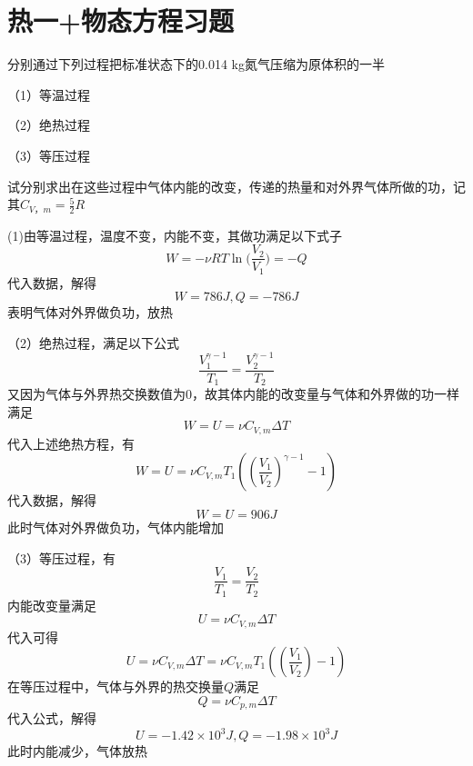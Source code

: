 \documentclass[lang=cn,10pt]{elegantbook}
\begin{document}
	\section{热一+物态方程习题}
	\begin{example}
		分别通过下列过程把标准状态下的0.014 kg氮气压缩为原体积的一半
		
		（1）等温过程
		
		（2）绝热过程
		
		（3）等压过程
		
		试分别求出在这些过程中气体内能的改变，传递的热量和对外界气体所做的功，记其$C_{V，m}=\frac{5}{2}R$
	\end{example}
	\begin{solution}
		(1)由等温过程，温度不变，内能不变，其做功满足以下式子
		\begin{equation*}
			W=-\nu RT\ln\mathrm{(}\frac{V_2}{V_1})=-Q
		\end{equation*}
		代入数据，解得
		\begin{equation*}
			W=786J,Q=-786J
		\end{equation*}
		表明气体对外界做负功，放热
		
		（2）绝热过程，满足以下公式
		\begin{equation*}
			\frac{V_{1}^{\gamma-1}}{T_{1}}=\frac{V_{2}^{\gamma-1}}{T_{2}}
		\end{equation*}
		又因为气体与外界热交换数值为0，故其体内能的改变量与气体和外界做的功一样
		满足
		\begin{equation*}
			W=U=\nu C_{V,m}\varDelta T
		\end{equation*}
		代入上述绝热方程，有
		\begin{equation}
			W=U=\nu C_{V,m}T_1((\frac{V_1}{V_2})^{\gamma -1}-1)
		\end{equation}
		代入数据，解得
		\begin{equation*}
			W=U=906J
		\end{equation*}
		此时气体对外界做负功，气体内能增加
		
		（3）等压过程，有
		\begin{equation*}
			\frac{V_{1}}{T_{1}}=\frac{V_{2}}{T_{2}}
		\end{equation*}
		内能改变量满足
		\begin{equation*}
			U=\nu C_{V,m}\varDelta T
		\end{equation*}
		代入可得
		\begin{equation*}
			U=\nu C_{V,m}\varDelta T=\nu C_{V,m}T_1((\frac{V_1}{V_2})-1)
		\end{equation*}
		在等压过程中，气体与外界的热交换量$Q$满足
		\begin{equation*}
			Q=\nu C_{p,m}\varDelta T
		\end{equation*}
		代入公式，解得
		\begin{equation*}
			U=-1.42\times10^{3}J,Q=-1.98\times10^{3}J
		\end{equation*}
		此时内能减少，气体放热
		

\end{solution}
\end{document}
